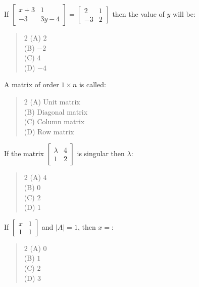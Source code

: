 \documentclass[11pt,a4paper]{article}
\begin{document}
\begin{mcqlist}
\item If $\begin{bmatrix}x+3&1\\-3&3y-4\end{bmatrix}=\begin{bmatrix}2&1\\-3&2\end{bmatrix}$ then the value of $y$ will be:
\begin{quote}\begin{multicols}{2}
\noindent (A) $2$ \\
(B) $-2$ \\
(C) $4$ \\
(D) $-4$
\end{multicols}\end{quote}

\item A matrix of order $1\times n$ is called:
\begin{quote}\begin{multicols}{2}
\noindent (A) Unit matrix \\
(B) Diagonal matrix \\
(C) Column matrix \\
(D) Row matrix
\end{multicols}\end{quote}

\item If the matrix $\begin{bmatrix}\lambda&4\\1&2\end{bmatrix}$ is singular then $\lambda$:
\begin{quote}\begin{multicols}{2}
\noindent (A) $4$ \\
(B) $0$ \\
(C) $2$ \\
(D) $1$
\end{multicols}\end{quote}

\item If $\begin{bmatrix}x&1\\1&1\end{bmatrix}$ and $|A|=1$, then $x=$:
\begin{quote}\begin{multicols}{2}
\noindent (A) $0$ \\
(B) $1$ \\
(C) $2$ \\
(D) $3$
\end{multicols}\end{quote}


\end{mcqlist}
\end{document}
